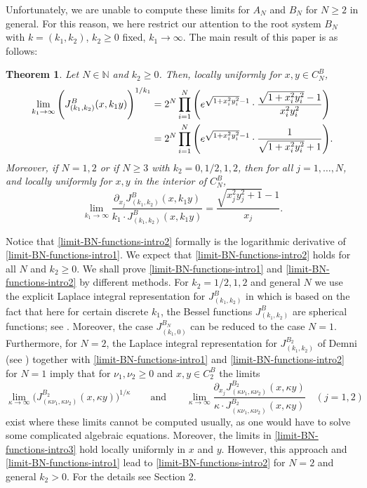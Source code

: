 \documentclass[reqno]{amsart}
\theoremstyle{plain}
\newtheorem{theorem}{Theorem}[section]
\theoremstyle{definition}
\numberwithin{equation}{section}
\newcommand{\N}{\mathbb{N}}
\begin{document}
Unfortunately, we are unable to compute these limits for $A_{N}$ and $B_N$ 
 for $N\ge2$ in general. For this reason, we here restrict our attention  to the root system $B_N$ with $k=(k_1,k_2)$,
 $k_2\ge0$ fixed, $k_1\to\infty$. The main result of this paper  is as follows:

\begin{theorem}\label{limit-BN-functions-intro}
Let  $N \in \N$ and $k_2\ge 0$. Then, locally uniformly for $x,y \in C_N^B$, 
\begin{align}\label{limit-BN-functions-intro1}
\lim_{k_1 \to \infty} \Bigg( J_{(k_1,k_2)}^{B}(x,k_1 y) \Bigg)^{1/k_1}
&= 2^N\prod\limits_{i=1}^N \Bigg( e^{\sqrt{1+x_i^2 y_i^2}-1}\cdot \frac{\sqrt{1+x_i^2 y_i^2}-1}{x_i^2 y_i^2} \Bigg)\notag\\
&= 2^N\prod\limits_{i=1}^N \Bigg( e^{\sqrt{1+x_i^2 y_i^2}-1}\cdot \frac{1}{\sqrt{1+x_i^2 y_i^2}+1} \Bigg).
\end{align}
Moreover, if  $N=1,2$ or if $N\ge3$ with $k_2=0,1/2,1,2$, then for all  $j=1,\ldots,N$, and locally uniformly for $x,y$ in the interior of $C_N^B$,
\begin{equation}\label{limit-BN-functions-intro2}
\lim_{k_1 \to \infty} \frac{\partial_{x_j} J_{(k_1,k_2)}^B(x,k_1 y) }{k_1 \cdot J_{(k_1,k_2)}^B( x,k_1 y)}
= \frac{\sqrt{x_j^2y_j^2+1}-1}{x_j}.
\end{equation}
\end{theorem}


Notice that \eqref{limit-BN-functions-intro2} formally is the logarithmic derivative of \eqref{limit-BN-functions-intro1}.
We expect that
\eqref{limit-BN-functions-intro2}  holds for all $N$ and $k_2\ge0$. We shall prove 
\eqref{limit-BN-functions-intro1} and
\eqref{limit-BN-functions-intro2}  by different methods. 
For  $k_2=1/2,1,2$ and general $N$ we use
the explicit Laplace integral representation  for $J_{(k_1,k_2)}^{B}$ in \cite{R4} which is based on the fact that here for certain discrete
$k_1$, the Bessel functions 
$J_{(k_1,k_2)}^B$ are spherical functions; see \cite{FK}. Moreover,  the case $J_{(k_1,0)}^{B_N}$ can be reduced to the case $N=1$.
Furthermore, for $N=2$, the Laplace integral representation for $J_{(k_1,k_2)}^{B_2}$ of Demni (see \cite{De, AD})
together with 
 \eqref{limit-BN-functions-intro1} and
\eqref{limit-BN-functions-intro2} for $N=1$ imply that for $\nu_1,\nu_2\ge0$ and $x,y\in C_2^B$ the limits
\begin{equation}\label{limit-BN-functions-intro3}
\lim_{\kappa \to \infty} \Bigg( J_{(\kappa \nu_1,\kappa \nu_2)}^{B_2}(x,\kappa y) \Bigg)^{1/\kappa} \quad\quad\text{and}\quad\quad
\lim_{\kappa \to \infty} \frac{\partial_{x_j} J_{(\kappa \nu_1,\kappa \nu_2)}^{B_2}(x,\kappa y) }{\kappa \cdot J_{(\kappa \nu_1,\kappa \nu_2)}^{B_2}(x,\kappa y)}  \quad(j=1,2)
\end{equation}
exist where these limits cannot be computed usually, as one would have to solve some complicated algebraic equations.
Moreover, the limits in \eqref{limit-BN-functions-intro3} hold locally uniformly in $x$ and $y$.
However, this approach and \eqref{limit-BN-functions-intro1} lead to \eqref{limit-BN-functions-intro2}  for $N=2$
and general $k_2>0$. For the details  see Section 2.
\end{document}
